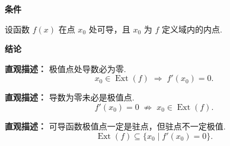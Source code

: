 \begin{statementbox}
	\textbf{\textcolor{CStatement}{条件}}
	\begin{description}[style=nextline, leftmargin=2.8em, labelsep=0.5em, itemsep=0.35em]
		\item[\textbf{\textcolor{CStatement}{条件一（可导条件）}}]
			设函数 $f(x)$ 在点 $x_0$ 处可导，且 $x_0$ 为 $f$ 定义域内的内点.
	\end{description}
	\textbf{\textcolor{CStatement}{结论}}
	\begin{description}[style=nextline, leftmargin=2.8em, labelsep=0.5em, itemsep=0.45em]
		\item[\textbf{\textcolor{CStatement}{结论一（必要关系）}}]
			\textbf{\textcolor{CStatement}{直观描述：}}
			极值点处导数必为零.
			\[
				x_0\in\operatorname{Ext}(f)\;\Rightarrow\;f'(x_0)=0.
			\]
		\item[\textbf{\textcolor{CStatement}{结论二（不充分性）}}]
			\textbf{\textcolor{CStatement}{直观描述：}}
			导数为零未必是极值点.
			\[
				f'(x_0)=0\;\not\Rightarrow\;x_0\in\operatorname{Ext}(f).
			\]
		\item[\textbf{\textcolor{CStatement}{推广结论（驻点极值关系）}}]
			\textbf{\textcolor{CStatement}{直观描述：}}
			可导函数极值点一定是驻点，但驻点不一定极值.
			\[
				\operatorname{Ext}(f)\subseteq\{x_0\mid f'(x_0)=0\}.
			\]
	\end{description}

\end{statementbox}
